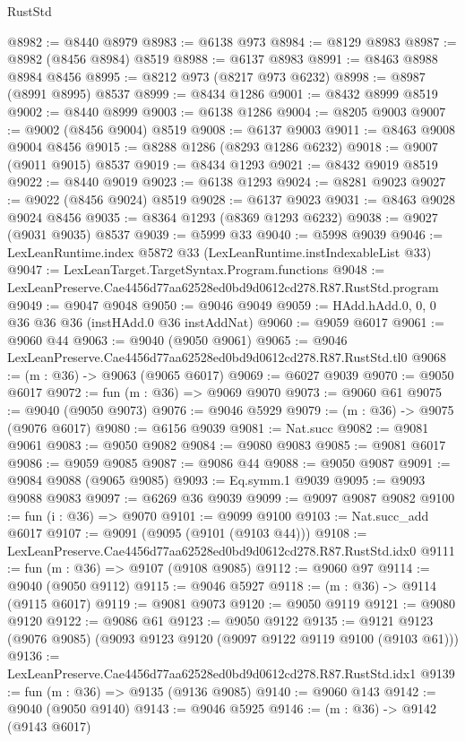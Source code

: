 \begin{lexlean}{RustStd}
\begin{coremodule}
{{@8982 := @8440 @8979
@8983 := @6138 @973
@8984 := @8129 @8983
@8987 := @8982 (@8456 @8984) @8519
@8988 := @6137 @8983
@8991 := @8463 @8988 @8984 @8456
@8995 := @8212 @973 (@8217 @973 @6232)
@8998 := @8987 (@8991 @8995) @8537
@8999 := @8434 @1286
@9001 := @8432 @8999 @8519
@9002 := @8440 @8999
@9003 := @6138 @1286
@9004 := @8205 @9003
@9007 := @9002 (@8456 @9004) @8519
@9008 := @6137 @9003
@9011 := @8463 @9008 @9004 @8456
@9015 := @8288 @1286 (@8293 @1286 @6232)
@9018 := @9007 (@9011 @9015) @8537
@9019 := @8434 @1293
@9021 := @8432 @9019 @8519
@9022 := @8440 @9019
@9023 := @6138 @1293
@9024 := @8281 @9023
@9027 := @9022 (@8456 @9024) @8519
@9028 := @6137 @9023
@9031 := @8463 @9028 @9024 @8456
@9035 := @8364 @1293 (@8369 @1293 @6232)
@9038 := @9027 (@9031 @9035) @8537
@9039 := @5999 @33
@9040 := @5998 @9039
@9046 := LexLeanRuntime.index @5872 @33 (LexLeanRuntime.instIndexableList @33)
@9047 := LexLeanTarget.TargetSyntax.Program.functions
@9048 := LexLeanPreserve.Cae4456d77aa62528ed0bd9d0612cd278.R87.RustStd.program
@9049 := @9047 @9048
@9050 := @9046 @9049
@9059 := HAdd.hAdd.{0, 0, 0} @36 @36 @36 (instHAdd.{0} @36 instAddNat)
@9060 := @9059 @6017
@9061 := @9060 @44
@9063 := @9040 (@9050 @9061)
@9065 := @9046 LexLeanPreserve.Cae4456d77aa62528ed0bd9d0612cd278.R87.RustStd.tl0
@9068 := (m : @36) -> @9063 (@9065 @6017)
@9069 := @6027 @9039
@9070 := @9050 @6017
@9072 := fun (m : @36) => @9069 @9070
@9073 := @9060 @61
@9075 := @9040 (@9050 @9073)
@9076 := @9046 @5929
@9079 := (m : @36) -> @9075 (@9076 @6017)
@9080 := @6156 @9039
@9081 := Nat.succ
@9082 := @9081 @9061
@9083 := @9050 @9082
@9084 := @9080 @9083
@9085 := @9081 @6017
@9086 := @9059 @9085
@9087 := @9086 @44
@9088 := @9050 @9087
@9091 := @9084 @9088 (@9065 @9085)
@9093 := Eq.symm.{1} @9039
@9095 := @9093 @9088 @9083
@9097 := @6269 @36 @9039
@9099 := @9097 @9087 @9082
@9100 := fun (i : @36) => @9070
@9101 := @9099 @9100
@9103 := Nat.succ_add @6017
@9107 := @9091 (@9095 (@9101 (@9103 @44)))
@9108 := LexLeanPreserve.Cae4456d77aa62528ed0bd9d0612cd278.R87.RustStd.idx0
@9111 := fun (m : @36) => @9107 (@9108 @9085)
@9112 := @9060 @97
@9114 := @9040 (@9050 @9112)
@9115 := @9046 @5927
@9118 := (m : @36) -> @9114 (@9115 @6017)
@9119 := @9081 @9073
@9120 := @9050 @9119
@9121 := @9080 @9120
@9122 := @9086 @61
@9123 := @9050 @9122
@9135 := @9121 @9123 (@9076 @9085) (@9093 @9123 @9120 (@9097 @9122 @9119 @9100 (@9103 @61)))
@9136 := LexLeanPreserve.Cae4456d77aa62528ed0bd9d0612cd278.R87.RustStd.idx1
@9139 := fun (m : @36) => @9135 (@9136 @9085)
@9140 := @9060 @143
@9142 := @9040 (@9050 @9140)
@9143 := @9046 @5925
@9146 := (m : @36) -> @9142 (@9143 @6017)
}}
\end{coremodule}
\end{lexlean}
